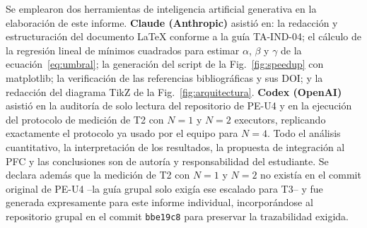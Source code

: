 \documentclass[10pt,journal]{IEEEtran}
\begin{document}
Se emplearon dos herramientas de inteligencia artificial generativa en la
elaboraci\'on de este informe. \textbf{Claude (Anthropic)} asisti\'o en: la
redacci\'on y estructuraci\'on del documento LaTeX conforme a la gu\'ia
TA-IND-04; el c\'alculo de la regresi\'on lineal de m\'inimos cuadrados para
estimar $\alpha$, $\beta$ y $\gamma$ de la ecuaci\'on~\eqref{eq:umbral}; la
generaci\'on del script de la Fig.~\ref{fig:speedup} con matplotlib; la
verificaci\'on de las referencias bibliogr\'aficas y sus DOI; y la redacci\'on
del diagrama TikZ de la Fig.~\ref{fig:arquitectura}. \textbf{Codex (OpenAI)}
asisti\'o en la auditor\'ia de solo lectura del repositorio de PE-U4 y en la
ejecuci\'on del protocolo de medici\'on de T2 con $N=1$ y $N=2$ executors,
replicando exactamente el protocolo ya usado por el equipo para $N=4$. Todo
el an\'alisis cuantitativo, la interpretaci\'on de los resultados, la
propuesta de integraci\'on al PFC y las conclusiones son de autor\'ia y
responsabilidad del estudiante. Se declara adem\'as que la medici\'on de T2
con $N=1$ y $N=2$ no exist\'ia en el commit original de PE-U4 --la gu\'ia
grupal solo exig\'ia ese escalado para T3-- y fue generada expresamente para
este informe individual, incorpor\'andose al repositorio grupal en el commit
\texttt{bbe19c8} para preservar la trazabilidad exigida.

\printbibliography
\end{document}
